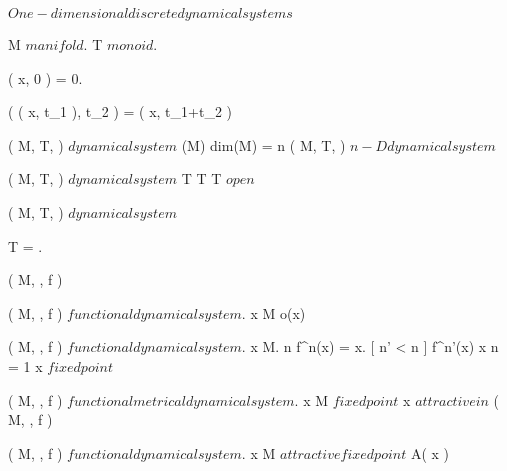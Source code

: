 \documentclass[../Main/main]{subfiles}
\begin{document}
\unit{ $ One-dimensional discrete dynamical systems $ }
{	
	
	
	{
		{
			M $ manifold $.
			T $ monoid $.

		}
		{
			{
				\phi( x, 0 ) = 0.

				{
					\phi( \phi( x, t_1 ), t_2 ) = \phi( x, t_1+t_2 )
				}
			}
		}

	}
	{
		{
			( M, T, \phi ) $ dynamical system $
		}
		{
			\dim(M)
		}
		\denote
		{
			dim(M) = n \as ( M, T, \phi ) $ n-D dynamical system $
		}
	}


	{
		{
			( M, T, \phi ) $ dynamical system $
		}
		{
			T \countable
		}
		{
			T \subset \R \suchthat T $ open $
		}
	}


	{
		{
			( M, T, \phi ) $ dynamical system $
		}
		{
			T = \N.

		}
		\denote
		{
			( M, \N, f )
		}
	}
	
	
	{
		{
			( M, \N, f ) $ functional dynamical system $.
			x \in M
		}
		{
		}
		\denote
		{
			o(x)
		}
	}
	
	
	{
		{
			( M, \N, f ) $ functional dynamical system $.
			x \in M.
			n \in \N
		}
		{
			f^n(x) = x.
			[ n' < n ]
			{
				f^{n'}(x) \neq x
			}
		}
		\denote
		{
			n = 1 \as x $ fixed point $
		}
	}
	

	{
		{
			( M, \N, f ) $ functional metrical dynamical system $.
			x \in M $ fixed point $
		}
		{
		}
		{
			x $ attractive in $ ( M, \N, f )
		}
	}
	
	
	{
		{
			( M, \N, f ) $ functional dynamical system $.
			x \in M $ attractive fixed point $
		}
		{
		}
		\denote
		{
			A( x )
		}
	}
	
}
\end{document}

